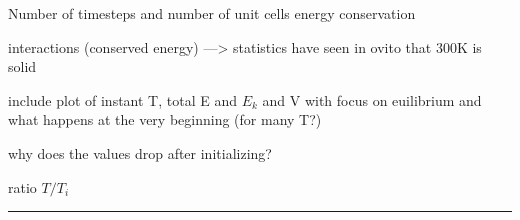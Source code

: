 \documentclass[11pt,a4wide]{article}
\begin{document}
Number of timesteps
and number of unit cells
energy conservation

interactions (conserved energy) ---> statistics
have seen in ovito that 300K is solid



include plot of instant T, total E and $E_k$ and V with focus on euilibrium and what happens at the very beginning (for many T?)

why does the values drop after initializing?

ratio $T/T_i$








\centering
\rule{0.3\textwidth}{0.4pt}\par %
\end{document}
